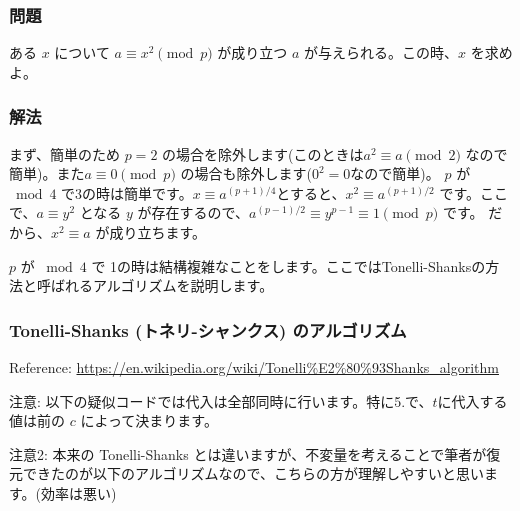 \documentclass{jsarticle}
\begin{document}
\subsubsection{問題}
ある $x$ について $a \equiv x^2 \pmod p$ が成り立つ $a$ が与えられる。この時、$x$ を求めよ。

\subsubsection{解法}
まず、簡単のため $p = 2$ の場合を除外します(このときは$a^2 \equiv a \pmod 2$ なので簡単)。また$a \equiv 0 \pmod p$ の場合も除外します($0^2 = 0$なので簡単)。
$p$ が${}\bmod 4$ で3の時は簡単です。$x \equiv a^{(p+1)/4}$とすると、$x^2 \equiv a^{(p+1)/2}$ です。ここで、$a \equiv y^2$ となる $y$ が存在するので、$a^{(p-1)/2}\equiv y^{p-1}\equiv 1 \pmod p$ です。
だから、$x^2 \equiv a$ が成り立ちます。

$p$ が ${}\bmod 4$ で 1の時は結構複雑なことをします。ここではTonelli-Shanksの方法と呼ばれるアルゴリズムを説明します。

   \subsubsection{Tonelli-Shanks (トネリ-シャンクス) のアルゴリズム}
Reference: \url{https://en.wikipedia.org/wiki/Tonelli%E2%80%93Shanks_algorithm}

注意: 以下の疑似コードでは代入は全部同時に行います。特に5.で、$t$に代入する値は前の $c$ によって決まります。

注意2: 本来の Tonelli-Shanks とは違いますが、不変量を考えることで筆者が復元できたのが以下のアルゴリズムなので、こちらの方が理解しやすいと思います。(効率は悪い)
\end{document}
